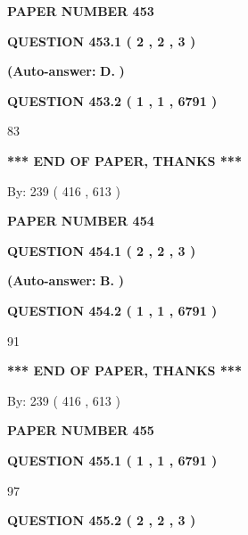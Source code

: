 \documentclass[12pt]{article}
\begin{document}
   
\newpage 
\setcounter{page}{ 
   453001 } 
   
   
 {\textbf{ \Large{ PAPER NUMBER  453  }}}
   
   
   
   
  
  
{\textbf{\large{QUESTION
453.1 
 ( 2 , 2 , 3 )
}}}
 
 
{\textbf{(Auto-answer:}}
{\textbf{\large{
D.}}}
{\textbf{)}}
 
 
  
  
{\textbf{\large{QUESTION
453.2 
 ( 1 , 1 , 6791 )
}}}

83
   
   
   
   
\vspace{1.0in} 
{\textbf{\large{ *** END OF PAPER, THANKS *** }}} 
   
   
\hspace{1.0in} By: 
 239 ( 416 ,  613 )
   
   
   
   
\newpage 
\setcounter{page}{ 
   454001 } 
   
   
 {\textbf{ \Large{ PAPER NUMBER  454  }}}
   
   
   
   
  
  
{\textbf{\large{QUESTION
454.1 
 ( 2 , 2 , 3 )
}}}
 
 
{\textbf{(Auto-answer:}}
{\textbf{\large{
B.}}}
{\textbf{)}}
 
 
  
  
{\textbf{\large{QUESTION
454.2 
 ( 1 , 1 , 6791 )
}}}

91
   
   
   
   
\vspace{1.0in} 
{\textbf{\large{ *** END OF PAPER, THANKS *** }}} 
   
   
\hspace{1.0in} By: 
 239 ( 416 ,  613 )
   
   
   
   
\newpage 
\setcounter{page}{ 
   455001 } 
   
   
 {\textbf{ \Large{ PAPER NUMBER  455  }}}
   
   
   
   
  
  
{\textbf{\large{QUESTION
455.1 
 ( 1 , 1 , 6791 )
}}}

97
  
  
{\textbf{\large{QUESTION
455.2 
 ( 2 , 2 , 3 )
}}}
 
\end{document}
